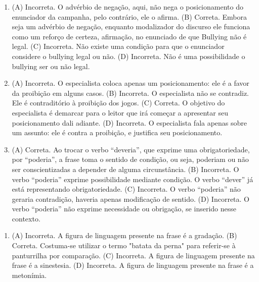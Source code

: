 \begin{enumerate}
\item (A) Incorreta. O advérbio de negação, aqui, não nega o posicionamento do
enunciador da campanha, pelo contrário, ele o afirma.
(B) Correta. Embora seja um advérbio de negação, enquanto modalizador do
discurso ele funciona como um reforço de certeza, afirmação, no
enunciado de que Bullying não é legal.
(C) Incorreta. Não existe uma condição para que o enunciador considere o
bullying legal ou não.
(D) Incorreta. Não é uma possibilidade o bullying ser ou não legal.

\item (A) Incorreta. O especialista coloca apenas um posicionamento: ele é a
favor da proibição em alguns casos.
(B) Incorreta. O especialista não se contradiz. Ele é contraditório à
proibição dos jogos.
(C) Correta. O objetivo do especialista é demarcar para o leitor que irá
começar a apresentar seu posicionamento dali adiante.
(D) Incorreta. O especialista fala apenas sobre um assunto: ele é contra
a proibição, e justifica seu posicionamento.

\item (A) Correta. Ao trocar o verbo ``deveria'', que exprime uma
obrigatoriedade, por ``poderia'', a frase toma o sentido de condição, ou
seja, poderiam ou não ser conscientizadas a depender de alguma
circunstância.
(B) Incorreta. O verbo ``poderia'' exprime possibilidade mediante
condição. O verbo ``dever'' já está representando obrigatoriedade.
(C) Incorreta. O verbo ``poderia'' não geraria contradição, haveria
apenas modificação de sentido.
(D) Incorreta. O verbo ``poderia'' não exprime necessidade ou obrigação,
se inserido nesse contexto.
\end{enumerate}


\begin{enumerate}
\item (A) Incorreta. A figura de linguagem presente na frase é a gradação.
(B) Correta. Costuma-se utilizar o termo "batata da perna" para
referir-se à panturrilha por comparação.
(C) Incorreta. A figura de linguagem presente na frase é a sinestesia.
(D) Incorreta. A figura de linguagem presente na frase é a metonímia.
\end{enumerate}


